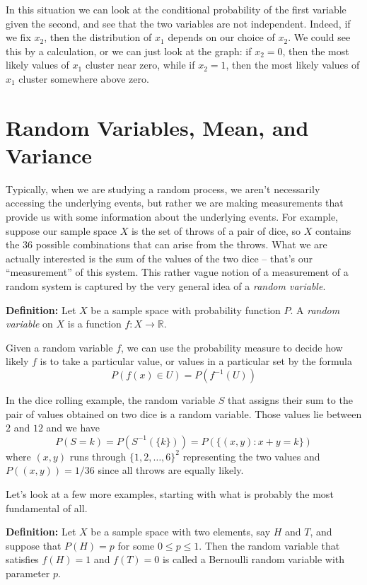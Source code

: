 \documentclass[
  oneside]{scrbook}
\begin{document}
In this situation we can look at the conditional probability of the
first variable given the second, and see that the two variables are not
independent. Indeed, if we fix \(x_2\), then the distribution of \(x_1\)
depends on our choice of \(x_2\). We could see this by a calculation, or
we can just look at the graph: if \(x_2=0\), then the most likely values
of \(x_1\) cluster near zero, while if \(x_2=1\), then the most likely
values of \(x_1\) cluster somewhere above zero.

\hypertarget{random-variables-mean-and-variance}{%
\section{Random Variables, Mean, and
Variance}\label{random-variables-mean-and-variance}}

Typically, when we are studying a random process, we aren't necessarily
accessing the underlying events, but rather we are making measurements
that provide us with some information about the underlying events. For
example, suppose our sample space \(X\) is the set of throws of a pair
of dice, so \(X\) contains the \(36\) possible combinations that can
arise from the throws. What we are actually interested is the sum of the
values of the two dice -- that's our ``measurement'' of this system.
This rather vague notion of a measurement of a random system is captured
by the very general idea of a \emph{random variable}.

\textbf{Definition:} Let \(X\) be a sample space with probability
function \(P\). A \emph{random variable} on \(X\) is a function
\(f:X\to \mathbb{R}\).

Given a random variable \(f\), we can use the probability measure to
decide how likely \(f\) is to take a particular value, or values in a
particular set by the formula \[
P(f(x)\in U) = P(f^{-1}(U))
\]

In the dice rolling example, the random variable \(S\) that assigns
their sum to the pair of values obtained on two dice is a random
variable. Those values lie between \(2\) and \(12\) and we have \[
P(S=k) = P(S^{-1}(\{k\}))=P(\{(x,y): x+y=k\})
\] where \((x,y)\) runs through \(\{1,2,\ldots,6\}^{2}\) representing
the two values and \(P((x,y))=1/36\) since all throws are equally
likely.

Let's look at a few more examples, starting with what is probably the
most fundamental of all.

\textbf{Definition:} Let \(X\) be a sample space with two elements, say
\(H\) and \(T\), and suppose that \(P(H)=p\) for some \(0\le p\le 1\).
Then the random variable that satisfies \(f(H)=1\) and \(f(T)=0\) is
called a Bernoulli random variable with parameter \(p\).
\end{document}
